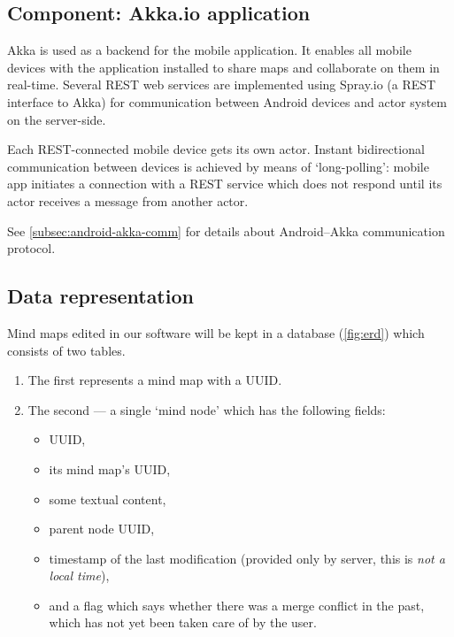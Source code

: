
\subsection{Component: Akka.io application}
\label{subsec:component-akka}


Akka is used as a backend for the mobile application. It enables all mobile devices with the application installed to share maps and collaborate on them in real-time. Several REST web services are implemented using Spray.io (a REST interface to Akka) for communication between Android devices and actor system on the server-side.

Each REST-connected mobile device gets its own actor. Instant bidirectional communication between devices is achieved by means of `long-polling': mobile app initiates a connection with a REST service which does not respond until its actor receives a message from another actor.

See \cref{subsec:android-akka-comm} for details about Android--Akka communication protocol.



\subsection{Data representation}
\label{subsec:data-repr}

Mind maps edited in our software will be kept in a database (\cref{fig:erd}) which consists of two tables.

\begin{enumerate}
	\item The first represents a mind map with a UUID.
	\item The second --- a single `mind node' which has the following fields: \begin{itemize}
		\item UUID,
		\item its mind map's UUID,
		\item some textual content,
		\item parent node UUID,
		\item timestamp of the last modification (provided only by server, this is \emph{not a local time}),
		\item and a flag which says whether there was a merge conflict in the past, which has not yet been taken care of by the user.
	\end{itemize}
\end{enumerate}


